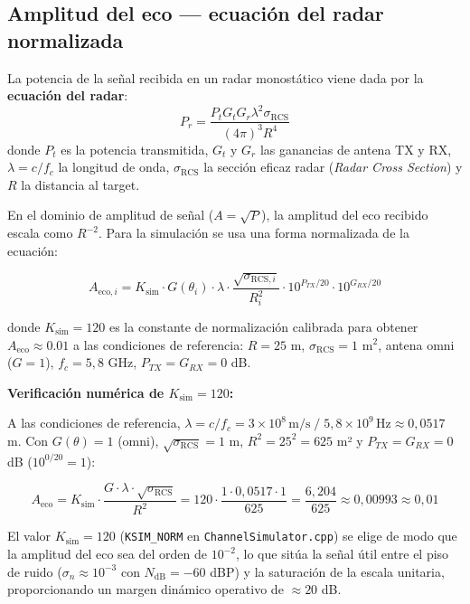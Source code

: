 \documentclass[11pt,a4paper]{article}
\begin{document}
\subsection{Amplitud del eco — ecuación del radar normalizada}

La potencia de la señal recibida en un radar monostático viene dada por la
\textbf{ecuación del radar}:
\begin{equation}
  P_r = \frac{P_t G_t G_r \lambda^2 \sigma_\text{RCS}}{(4\pi)^3 R^4}
  \label{eq:radar_equation}
\end{equation}
donde $P_t$ es la potencia transmitida, $G_t$ y $G_r$ las ganancias de antena TX y RX,
$\lambda = c/f_c$ la longitud de onda, $\sigma_\text{RCS}$ la sección eficaz radar
(\textit{Radar Cross Section}) y $R$ la distancia al target.

En el dominio de amplitud de señal ($A = \sqrt{P}$), la amplitud del eco recibido escala
como $R^{-2}$. Para la simulación se usa una forma normalizada de la ecuación:

\begin{mathbox}
\begin{equation}
  A_{\text{eco},i} = K_\text{sim} \cdot G(\theta_i) \cdot \lambda \cdot \frac{\sqrt{\sigma_{\text{RCS},i}}}{R_i^2}
  \cdot 10^{P_{TX}/20} \cdot 10^{G_{RX}/20}
  \label{eq:echo_amp}
\end{equation}

donde $K_\text{sim} = 120$ es la constante de normalización calibrada para obtener
$A_\text{eco} \approx 0.01$ a las condiciones de referencia: $R = 25$ m,
$\sigma_\text{RCS} = 1$ m$^2$, antena omni ($G = 1$), $f_c = 5{,}8$ GHz,
$P_{TX} = G_{RX} = 0$ dB.

\medskip
\textbf{Verificación numérica de $K_\text{sim} = 120$:}

A las condiciones de referencia, $\lambda = c/f_c = 3\!\times\!10^8\,\text{m/s}\;/\;5{,}8\!\times\!10^9\,\text{Hz} \approx 0{,}0517$ m.
Con $G(\theta)=1$ (omni), $\sqrt{\sigma_\text{RCS}}=1$ m, $R^2 = 25^2 = 625$ m² y $P_{TX}=G_{RX}=0$ dB ($10^{0/20}=1$):

\begin{equation}
  A_\text{eco} = K_\text{sim}\cdot \frac{G \cdot \lambda \cdot \sqrt{\sigma_\text{RCS}}}{R^2}
               = 120 \cdot \frac{1 \cdot 0{,}0517 \cdot 1}{625}
               = \frac{6{,}204}{625} \approx 0{,}00993 \approx 0{,}01
\end{equation}

El valor $K_\text{sim} = 120$ (\texttt{KSIM\_NORM} en \texttt{ChannelSimulator.cpp}) se elige de modo que la amplitud del eco sea del orden de $10^{-2}$, lo que sitúa la señal útil entre el piso de ruido ($\sigma_n \approx 10^{-3}$ con $N_\text{dB}=-60$ dBP) y la saturación de la escala unitaria, proporcionando un margen dinámico operativo de $\approx 20$ dB.
\end{mathbox}
\end{document}
